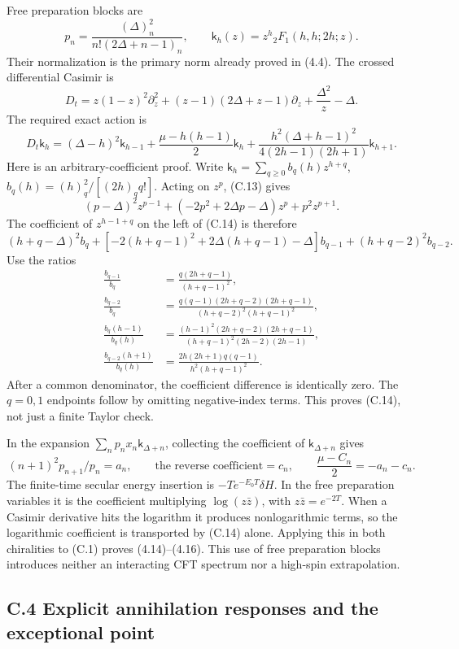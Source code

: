 \documentclass[a4paper,11pt]{article}
\numberwithin{equation}{section}
\begin{document}
Free preparation blocks are \[
p_n=\frac{(\Delta)_n^2}{n!(2\Delta+n-1)_n},
\qquad
\mathsf k_h(z)=z^h{}_2F_1(h,h;2h;z).
\tag{C.12}
\] Their normalization is the primary norm already proved in (4.4). The crossed differential Casimir is \[
D_t=z(1-z)^2\partial_z^2
+(z-1)(2\Delta+z-1)\partial_z+\frac{\Delta^2}{z}-\Delta .
\tag{C.13}
\] The required exact action is \[
D_t\mathsf k_h
=(\Delta-h)^2\mathsf k_{h-1}
+\frac{\mu-h(h-1)}2\mathsf k_h
+\frac{h^2(\Delta+h-1)^2}{4(2h-1)(2h+1)}\mathsf k_{h+1}.
\tag{C.14}
\] Here is an arbitrary-coefficient proof. Write \(\mathsf k_h=\sum_{q\ge0}b_q(h)z^{h+q}\), \(b_q(h)=(h)_q^2/[(2h)_q q!]\). Acting on \(z^p\), (C.13) gives \[
(p-\Delta)^2z^{p-1}
+(-2p^2+2\Delta p-\Delta)z^p+p^2z^{p+1}.
\] The coefficient of \(z^{h-1+q}\) on the left of (C.14) is therefore \[
(h+q-\Delta)^2b_q
+[-2(h+q-1)^2+2\Delta(h+q-1)-\Delta]b_{q-1}
+(h+q-2)^2b_{q-2}.
\] Use the ratios \[
\begin{aligned}
\frac{b_{q-1}}{b_q}
&=\frac{q(2h+q-1)}{(h+q-1)^2},\\
\frac{b_{q-2}}{b_q}
&=\frac{q(q-1)(2h+q-2)(2h+q-1)}
{(h+q-2)^2(h+q-1)^2},\\
\frac{b_q(h-1)}{b_q(h)}
&=\frac{(h-1)^2(2h+q-2)(2h+q-1)}
{(h+q-1)^2(2h-2)(2h-1)},\\
\frac{b_{q-2}(h+1)}{b_q(h)}
&=\frac{2h(2h+1)q(q-1)}
{h^2(h+q-1)^2}.
\end{aligned}
\tag{C.15}
\] After a common denominator, the coefficient difference is identically zero. The \(q=0,1\) endpoints follow by omitting negative-index terms. This proves (C.14), not just a finite Taylor check.

In the expansion \(\sum_np_nx_n\mathsf k_{\Delta+n}\), collecting the coefficient of \(\mathsf k_{\Delta+n}\) gives \[
(n+1)^2p_{n+1}/p_n=a_n,\qquad
\text{the reverse coefficient}=c_n,\qquad
\frac{\mu-C_n}{2}=-a_n-c_n .
\] The finite-time secular energy insertion is \(-T e^{-E_0T}\delta H\). In the free preparation variables it is the coefficient multiplying \(\log(z\bar z)\), with \(z\bar z=e^{-2T}\). When a Casimir derivative hits the logarithm it produces nonlogarithmic terms, so the logarithmic coefficient is transported by (C.14) alone. Applying this in both chiralities to (C.1) proves (4.14)--(4.16). This use of free preparation blocks introduces neither an interacting CFT spectrum nor a high-spin extrapolation.

\hypertarget{c.4-explicit-annihilation-responses-and-the-exceptional-point}{%
\subsection{C.4 Explicit annihilation responses and the exceptional point}\label{c.4-explicit-annihilation-responses-and-the-exceptional-point}}
\end{document}
